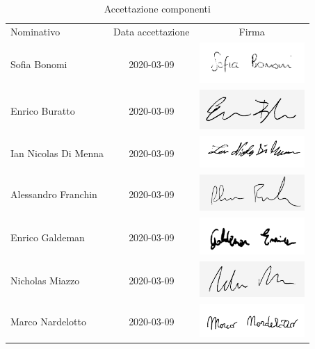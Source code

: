 \documentclass[../piano-di-progetto.tex]{subfiles}
\begin{document}
  \begin{table}[H]
    \centering
    \begin{tabular}{lcc}
      Nominativo & Data accettazione & Firma \\
      Sofia Bonomi & 2020-03-09 & \includegraphics[width=4cm]{img/sofia.png} \\
      Enrico Buratto & 2020-03-09 & \includegraphics[width=4cm]{img/enricob-g.png}     \\
      Ian Nicolas Di Menna & 2020-03-09 & \includegraphics[width=4cm]{img/ian.png}     \\
      Alessandro Franchin & 2020-03-09 & \includegraphics[width=4cm]{img/ale-g.png}     \\
      Enrico Galdeman & 2020-03-09 & \includegraphics[width=4cm]{img/enricog.png}     \\
      Nicholas Miazzo & 2020-03-09 & \includegraphics[width=4cm]{img/nicholas-g.png}     \\
      Marco Nardelotto & 2020-03-09 & \includegraphics[width=4cm]{img/marco.png}
    \end{tabular}
    \caption{Accettazione componenti}
  \end{table}
\end{document}
